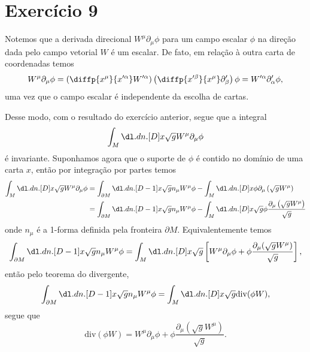 \section*{Exercício 9}
Notemos que a derivada direcional \(W^\mu \partial_\mu \phi\) para um campo escalar \(\phi\) na direção dada pelo campo vetorial \(W\) é um escalar. De fato, em relação à outra carta de coordenadas temos
\begin{equation*}
    W^\mu \partial_\mu \phi = \left(\diffp{x^\mu}{x'^\alpha}W'^\alpha\right)\left(\diffp{x'^\beta}{x^\mu}\partial'_\beta\right)\phi = W'^\alpha \partial'_\alpha \phi,
\end{equation*}
uma vez que o campo escalar é independente da escolha de cartas.

Desse modo, com o resultado do exercício anterior, segue que a integral
\begin{equation*}
    \int_M \dl.dn.[D]{x}\sqrt{g} W^\mu\partial_\mu \phi
\end{equation*}
é invariante. Suponhamos agora que o suporte de \(\phi\) é contido no domínio de uma carta \(x\), então por integração por partes temos
\begin{align*}
    \int_M \dl.dn.[D]{x}\sqrt{g} W^\mu\partial_\mu\phi &= \int_{\partial M} \dl.dn.[D-1]{x}\sqrt{g} n_\mu W^\mu \phi - \int_M \dl.dn.[D]{x}\phi \partial_\mu\left(\sqrt{g} W^\mu\right)\\
                                                       &= \int_{\partial M} \dl.dn.[D-1]{x}\sqrt{g} n_\mu W^\mu \phi - \int_M \dl.dn.[D]{x}\sqrt{g}\phi \frac{\partial_\mu\left(\sqrt{g} W^\mu\right)}{\sqrt{g}}
\end{align*}
onde \(n_\mu\) é a 1-forma definida pela fronteira \(\partial M\). Equivalentemente temos
\begin{equation*}
    \int_{\partial M}\dl.dn.[D-1]{x} \sqrt{g} n_\mu W^\mu \phi = \int_M \dl.dn.[D]{x}\sqrt{g}\left[W^\mu \partial_\mu \phi + \phi \frac{\partial_\mu(\sqrt{g}W^\mu)}{\sqrt{g}}\right],
\end{equation*}
então pelo teorema do divergente,
\begin{equation*}
    \int_{\partial M}\dl.dn.[D-1]{x} \sqrt{g} n_\mu W^\mu \phi = \int_M \dl.dn.[D]{x}\sqrt{g} \mathrm{div}(\phi W),
\end{equation*}
segue que
\begin{equation*}
    \mathrm{div}(\phi W) = W^\mu \partial_\mu \phi + \phi \frac{\partial_\mu(\sqrt{g}W^\mu)}{\sqrt{g}}.
\end{equation*}

